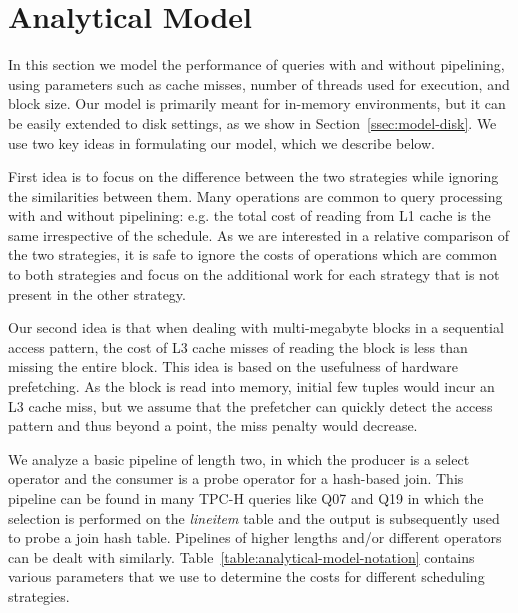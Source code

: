 \section{Analytical Model}\label{sec:model}
In this section we model the performance of queries with and without pipelining, using parameters such as cache misses, number of threads used for execution, and block size.
Our model is primarily meant for in-memory environments, but it can be easily extended to disk settings, as we show in Section~\ref{ssec:model-disk}.
We use two key ideas in formulating our model, which we describe below.

First idea is to focus on the difference between the two strategies while ignoring the similarities between them.
Many operations are common to query processing with and without pipelining: e.g. the total cost of reading from L1 cache is the same irrespective of the schedule.
As we are interested in a relative comparison of the two strategies, it is safe to ignore the costs of operations which are common to both strategies and focus on the additional work for each strategy that is not present in the other strategy. 

Our second idea is that when dealing with multi-megabyte blocks in a sequential access pattern, the cost of L3 cache misses of reading the block is less than missing the entire block.
This idea is based on the usefulness of hardware prefetching. 
As the block is read into memory, initial few tuples would incur an L3 cache miss, but we assume that the prefetcher can quickly detect the access pattern and thus beyond a point, the miss penalty would decrease. 

We analyze a basic pipeline of length two, in which the producer is a select operator and the consumer is a probe operator for a hash-based join. 
This pipeline can be found in many TPC-H queries like Q07 and Q19 in which the selection is performed on the \textit{lineitem} table and the output is subsequently used to probe a join hash table.
Pipelines of higher lengths and/or different operators can be dealt with similarly.
Table~\ref{table:analytical-model-notation} contains various parameters that we use to determine the costs for different scheduling strategies.

